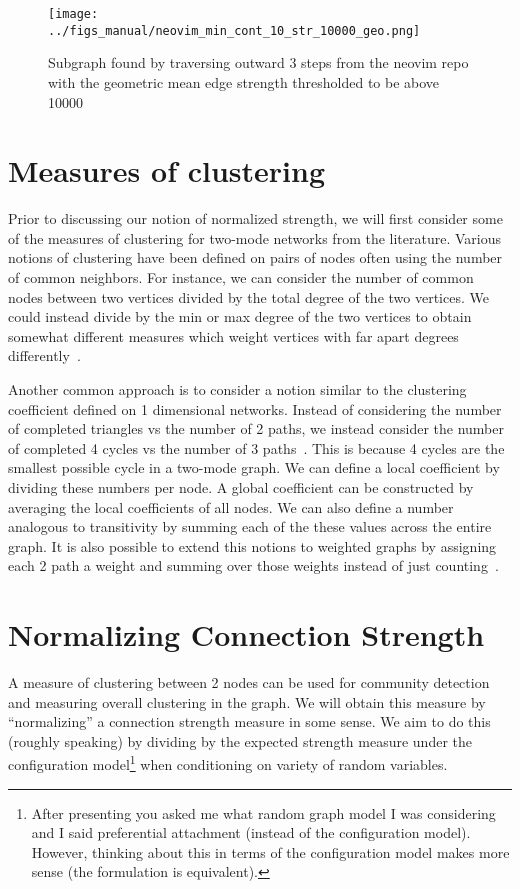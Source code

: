 \documentclass{pset}
\begin{document}
\begin{figure}[ht]
\centering
\texttt{[image: ../figs\_manual/neovim\_min\_cont\_10\_str\_10000\_geo.png]}
\caption{Subgraph found by traversing outward 3 steps from the neovim repo with
    the geometric mean edge strength thresholded to be above 10000}\label{fig:neovim geo}
\end{figure}

\section*{Measures of clustering}

Prior to discussing our notion of normalized strength,
we will first consider some of the measures of clustering for two-mode networks
from the literature.
Various notions of clustering have been defined on pairs of nodes
often using the number of common neighbors.
For instance, we can consider the number of common nodes between
two vertices divided by the total degree of the two vertices. We could instead
divide by
the min or max degree of the two vertices to obtain somewhat different
measures which weight vertices with far apart degrees differently~\cite{guillaume}.

Another common approach is to consider a notion similar to the clustering coefficient
defined on 1 dimensional networks. Instead of considering the number of completed
triangles vs the number of 2 paths, we instead consider the
number of completed 4 cycles vs the number of 3 paths~\cite{robins}.
This is because 4 cycles are the smallest possible cycle in a two-mode graph.
We can define a local coefficient by dividing these numbers per node.
A global coefficient can be constructed by averaging the local coefficients of
all nodes.
We can also define a number analogous to transitivity by summing each
of the these values across the entire graph.
It is also possible to extend this notions to weighted
graphs by assigning each 2 path a weight and summing over those weights instead
of just counting~\cite{opsahl}.

\section*{Normalizing Connection Strength}

A measure of clustering between 2 nodes can be used for community detection and
measuring overall clustering in the graph.   We will obtain this measure by
``normalizing'' a connection strength measure in some sense. We aim to do this
(roughly speaking) by dividing by the expected strength measure under
the configuration model\footnote{After presenting you asked me what random graph model I was considering and I said preferential attachment (instead of the configuration model). However, thinking about this in terms of the configuration model makes more sense (the formulation is equivalent).} when conditioning on variety of random variables.
\end{document}
